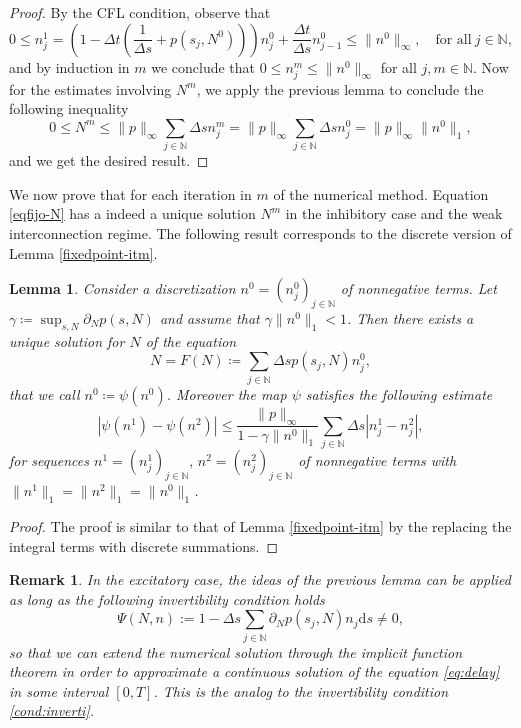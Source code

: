 \documentclass[11pt,a4paper]{article}
\newcommand{\N}{\mathbb{N}}
\newcommand{\dd}{\mathrm{d}}
\newtheorem{lemma}{Lemma}[section]
\newtheorem{remark}{Remark}[section]
\begin{document}
\begin{proof}
By the CFL condition, observe that 
\begin{equation*}
0\le n_j^{1}=\left(1-\Delta t\left( \frac{1}{\Delta s}+p(s_j,N^0) \right) \right)n_j^0+\frac{\Delta t}{\Delta s}n_{j-1}^0\le \|n^0\|_\infty, \quad\textrm{for all}\:j\in\N,
\end{equation*}
and by induction in $m$ we conclude that $0\le n^m_j\le\|n^0\|_\infty$ for all $j,m\in\N$. Now for the estimates involving $N^m$, we apply the previous lemma to conclude the following inequality
\begin{equation*}
0\le N^m\le \|p\|_\infty\sum_{j\in\N}\Delta s n^m_j = \|p\|_\infty\sum_{j\in\N}\Delta s n^0_j= \|p\|_\infty\|n^0\|_1,
\end{equation*}
and we get the desired result.
\end{proof}

We now prove that for each iteration in $m$ of the numerical method. Equation \eqref{eqfijo-N} has a indeed a unique solution $N^m$ in the inhibitory case and the weak interconnection regime. The following result corresponds to the discrete version of Lemma \ref{fixedpoint-itm}.

\begin{lemma}
\label{fixedpoint-discret}
    Consider a discretization $n^0=(n^0_j)_{j\in\N}$ of nonnegative terms. Let $\gamma \coloneqq \sup_{s,N}\partial_N p(s,N)$ and assume that $\gamma\|n^0\|_1<1$. Then there exists a unique solution for $N$ of the equation
 \begin{equation*}
    N=F(N)\coloneqq\sum_{j\in\N}\Delta s p(s_j,N)n^0_j,
 \end{equation*}
    that we call $n^0\coloneqq\psi(n^0)$. Moreover the map $\psi$ satisfies the following estimate
    \begin{equation}
        \label{psi-lip}
        |\psi(n^1)-\psi(n^2)|\le \frac{\|p\|_\infty}{1-\gamma\|n^0\|_1}\sum_{j\in\N}\Delta s|n^1_j-n^2_j|,
    \end{equation}
    for sequences $n^1=(n^1_j)_{j\in\N},\,n^2=(n^2_j)_{j\in\N}$ of nonnegative terms with $\|n^1\|_1=\|n^2\|_1=\|n^0\|_1$.
\end{lemma}

\begin{proof}
    The proof is similar to that of Lemma \ref{fixedpoint-itm} by the replacing the integral terms with discrete summations.
\end{proof}

\begin{remark}
    In the excitatory case, the ideas of the previous lemma can be applied as long as the following invertibility condition holds
    \begin{equation}
      \Psi(N,n):= 1-\Delta s\sum_{j\in\N} \partial_N p(s_j,N)n_j\dd s\neq 0,  
    \end{equation}
    so that we can extend the numerical solution through the implicit function theorem in order to approximate a continuous solution of the equation \eqref{eq:delay} in some interval $[0,T]$. This is the analog to the invertibility condition \eqref{cond:inverti}.
\end{remark}
\end{document}
